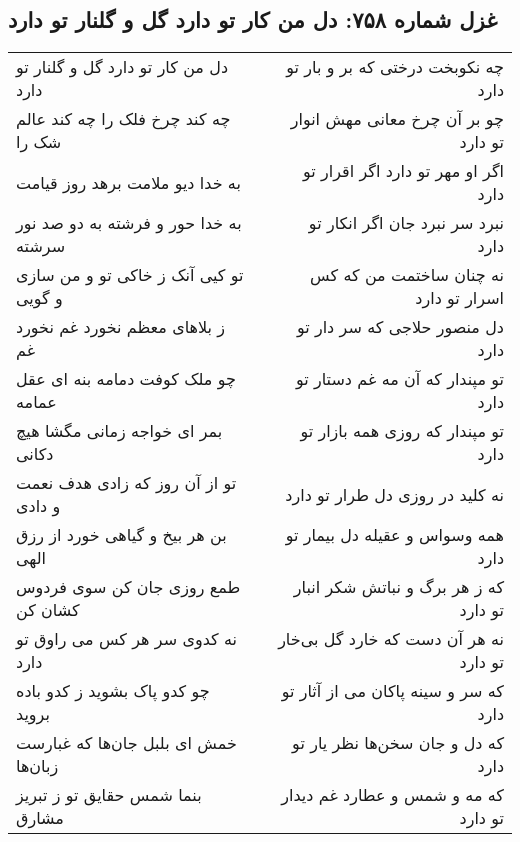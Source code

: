 \begin{center}
\section*{غزل شماره ۷۵۸: دل من کار تو دارد گل و گلنار تو دارد}
\label{sec:0758}
\begin{longtable}{l p{0.5cm} r}
دل من کار تو دارد گل و گلنار تو دارد
&&
چه نکوبخت درختی که بر و بار تو دارد
\\
چه کند چرخ فلک را چه کند عالم شک را
&&
چو بر آن چرخ معانی مهش انوار تو دارد
\\
به خدا دیو ملامت برهد روز قیامت
&&
اگر او مهر تو دارد اگر اقرار تو دارد
\\
به خدا حور و فرشته به دو صد نور سرشته
&&
نبرد سر نبرد جان اگر انکار تو دارد
\\
تو کیی آنک ز خاکی تو و من سازی و گویی
&&
نه چنان ساختمت من که کس اسرار تو دارد
\\
ز بلاهای معظم نخورد غم نخورد غم
&&
دل منصور حلاجی که سر دار تو دارد
\\
چو ملک کوفت دمامه بنه ای عقل عمامه
&&
تو مپندار که آن مه غم دستار تو دارد
\\
بمر ای خواجه زمانی مگشا هیچ دکانی
&&
تو مپندار که روزی همه بازار تو دارد
\\
تو از آن روز که زادی هدف نعمت و دادی
&&
نه کلید در روزی دل طرار تو دارد
\\
بن هر بیخ و گیاهی خورد از رزق الهی
&&
همه وسواس و عقیله دل بیمار تو دارد
\\
طمع روزی جان کن سوی فردوس کشان کن
&&
که ز هر برگ و نباتش شکر انبار تو دارد
\\
نه کدوی سر هر کس می راوق تو دارد
&&
نه هر آن دست که خارد گل بی‌خار تو دارد
\\
چو کدو پاک بشوید ز کدو باده بروید
&&
که سر و سینه پاکان می از آثار تو دارد
\\
خمش ای بلبل جان‌ها که غبارست زبان‌ها
&&
که دل و جان سخن‌ها نظر یار تو دارد
\\
بنما شمس حقایق تو ز تبریز مشارق
&&
که مه و شمس و عطارد غم دیدار تو دارد
\\
\end{longtable}
\end{center}
